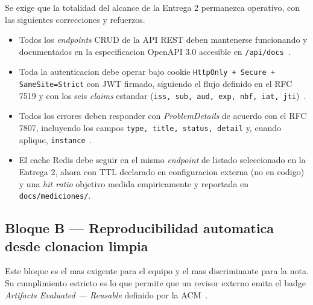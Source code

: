 \documentclass[11pt,a4paper]{article}
\begin{document}
Se exige que la totalidad del alcance de la Entrega 2 permanezca operativo, con las siguientes correcciones y refuerzos.

\begin{itemize}
    \item Todos los \emph{endpoints} CRUD de la API REST deben mantenerse funcionando y documentados en la especificacion OpenAPI 3.0 accesible en \texttt{/api/docs}~\cite{fielding2000rest,walls2022spring}.
    \item Toda la autenticacion debe operar bajo cookie \texttt{HttpOnly + Secure + SameSite=Strict} con JWT firmado, siguiendo el flujo definido en el RFC 7519 y con los seis \emph{claims} estandar (\texttt{iss, sub, aud, exp, nbf, iat, jti})~\cite{jones2015jwt}.
    \item Todos los errores deben responder con \emph{ProblemDetails} de acuerdo con el RFC 7807, incluyendo los campos \texttt{type, title, status, detail} y, cuando aplique, \texttt{instance}~\cite{rfc7807}.
    \item El cache Redis debe seguir en el mismo \emph{endpoint} de listado seleccionado en la Entrega 2, ahora con TTL declarado en configuracion externa (no en codigo) y una \emph{hit ratio} objetivo medida empiricamente y reportada en \texttt{docs/mediciones/}.
\end{itemize}

\subsection{Bloque B --- Reproducibilidad automatica desde clonacion limpia}

Este bloque es el mas exigente para el equipo y el mas discriminante para la nota. Su cumplimiento estricto es lo que permite que un revisor externo emita el badge \emph{Artifacts Evaluated --- Reusable} definido por la ACM~\cite{acm2020artifact}.
\end{document}
